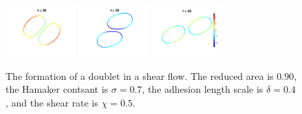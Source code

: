 \documentclass[%
preprint,
 amsmath,amssymb,
 aps,
]{revtex4-1}
\begin{document}
\begin{figure}[htp]
  \includegraphics[width=0.24\textwidth]{figs/adR4em1adS7em1Chi5em1_ra090_image06.png}
  \includegraphics[width=0.24\textwidth]{figs/adR4em1adS7em1Chi5em1_ra090_image07.png}
  \includegraphics[width=0.24\textwidth]{figs/adR4em1adS7em1Chi5em1_ra090_image08.png}
  \caption{\label{fig:doublet090} The formation of a doublet in a shear
  flow.  The reduced area is $0.90$, the Hamaker contsant is $\sigma=0.7$, the
adhesion length scale is $\delta = 0.4$, and the shear rate is $\chi=0.5$.}
\end{figure}
\end{document}
